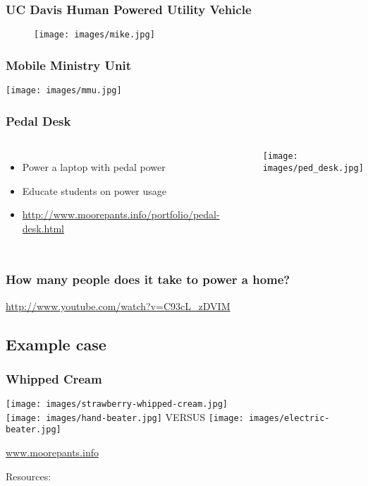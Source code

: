 \documentclass[]{beamer}
\begin{document}
\frame
{
    \frametitle{UC Davis Human Powered Utility Vehicle}
    \begin{center}
        \begin{figure}[]
            \texttt{[image: images/mike.jpg]}
        \end{figure}
    \end{center}
}
\frame
{
    \frametitle{Mobile Ministry Unit}
    \begin{center}
      \texttt{[image: images/mmu.jpg]}
    \end{center}
}
\frame
{
    \frametitle{Pedal Desk}
    \begin{columns}[t]
        \column{6cm}
        \begin{itemize}
            \item Power a laptop with pedal power
            \item Educate students on power usage
            \item \url{http://www.moorepants.info/portfolio/pedal-desk.html}
        \end{itemize}
        \column{5cm}
        \begin{center}
        \begin{figure}[]
            \texttt{[image: images/ped\_desk.jpg]}
        \end{figure}
        \end{center}
    \end{columns}
}
\frame
{
    \frametitle{How many people does it take to power a home?}
    \url{http://www.youtube.com/watch?v=C93cL_zDVIM}
}
\subsection{Example case}
\frame
{
    \frametitle{Whipped Cream}
    \begin{center}
      \texttt{[image: images/strawberry-whipped-cream.jpg]}
      \\
      \texttt{[image: images/hand-beater.jpg]}
      \large{VERSUS}
      \texttt{[image: images/electric-beater.jpg]}
    \end{center}
}
\begin{frame}[shrink=30]
  \begin{center}
    \alert{\url{www.moorepants.info}}\\
  \end{center}
  Resources:
  \nocite{McCullagh1977}
  \nocite{Wilson1986}
  \nocite{Wilson2004}
  \nocite{Dean2008}
  \nocite{Jansen2011}

  
  \small
\end{frame}
\end{document}
